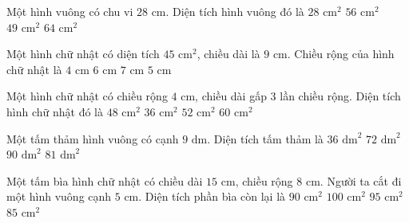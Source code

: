 \begin{ex} %
Một hình vuông có chu vi $28\text{ cm}$. Diện tích hình vuông đó là
\choice
{$28\text{ cm}^2$}
{$56\text{ cm}^2$}
{\True $49\text{ cm}^2$}
{$64\text{ cm}^2$}
\end{ex}

\begin{ex} %
Một hình chữ nhật có diện tích $45\text{ cm}^2$, chiều dài là $9\text{ cm}$. Chiều rộng của hình chữ nhật là
\choice
{$4\text{ cm}$}
{$6\text{ cm}$}
{$7\text{ cm}$}
{\True $5\text{ cm}$}
\end{ex}

\begin{ex} %
Một hình chữ nhật có chiều rộng $4\text{ cm}$, chiều dài gấp 3 lần chiều rộng. Diện tích hình chữ nhật đó là
\choice
{\True $48\text{ cm}^2$}
{$36\text{ cm}^2$}
{$52\text{ cm}^2$}
{$60\text{ cm}^2$}
\end{ex}

\begin{ex} %
Một tấm thảm hình vuông có cạnh $9\text{ dm}$. Diện tích tấm thảm là
\choice
{$36\text{ dm}^2$}
{$72\text{ dm}^2$}
{$90\text{ dm}^2$}
{\True $81\text{ dm}^2$}
\end{ex}

\begin{ex} %
Một tấm bìa hình chữ nhật có chiều dài $15\text{ cm}$, chiều rộng $8\text{ cm}$. Người ta cắt đi một hình vuông cạnh $5\text{ cm}$. Diện tích phần bìa còn lại là
\choice
{$90\text{ cm}^2$}
{$100\text{ cm}^2$}
{\True $95\text{ cm}^2$}
{$85\text{ cm}^2$}
\end{ex}

